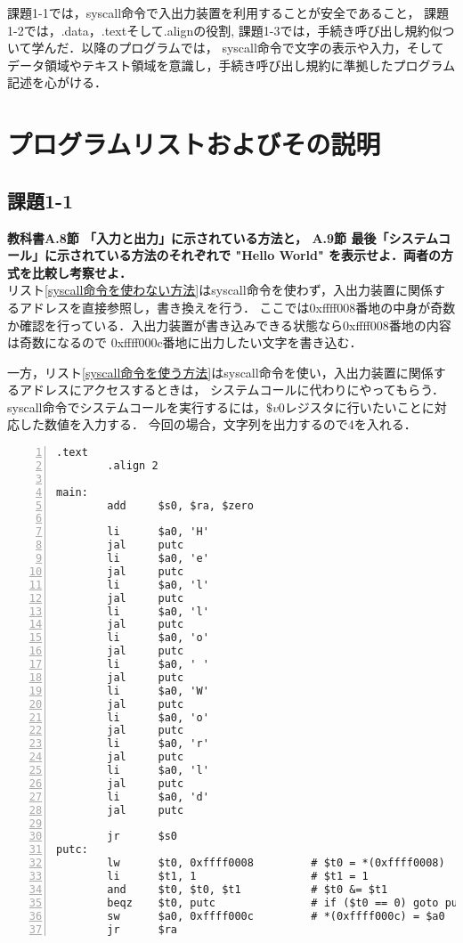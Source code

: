 \documentclass[11pt]{jarticle}
\begin{document}
課題1-1では，syscall命令で入出力装置を利用することが安全であること，
課題1-2では，.data，.textそして.alignの役割,
課題1-3では，手続き呼び出し規約似ついて学んだ．以降のプログラムでは，
syscall命令で文字の表示や入力，そしてデータ領域やテキスト領域を意識し，手続き呼び出し規約に準拠したプログラム記述を心がける．

\section{プログラムリストおよびその説明}

\subsection{課題1-1}

\textbf{教科書A.8節 「入力と出力」に示されている方法と， A.9節 最後「システムコール」に示されている方法のそれぞれで "Hello World" を表示せよ．両者の方式を比較し考察せよ．}\\

リスト\ref{syscall命令を使わない方法}はsyscall命令を使わず，入出力装置に関係するアドレスを直接参照し，書き換えを行う．
ここでは0xffff008番地の中身が奇数か確認を行っている．入出力装置が書き込みできる状態なら0xffff008番地の内容は奇数になるので
0xffff000c番地に出力したい文字を書き込む．

一方，リスト\ref{syscall命令を使う方法}はsyscall命令を使い，入出力装置に関係するアドレスにアクセスするときは，
システムコールに代わりにやってもらう．
syscall命令でシステムコールを実行するには，$\$v0$レジスタに行いたいことに対応した数値を入力する．
今回の場合，文字列を出力するので4を入れる．

\begin{lstlisting}[caption=syscall命令を使わない方法,label=syscall命令を使わない方法,numbers=left]
        .text
        .align 2

main:
        add     $s0, $ra, $zero
		
        li      $a0, 'H'                
        jal     putc
        li      $a0, 'e'                
        jal     putc
        li      $a0, 'l'                
        jal     putc
        li      $a0, 'l'                
        jal     putc
        li      $a0, 'o'                
        jal     putc   
        li      $a0, ' '                
        jal     putc   
        li      $a0, 'W'                
        jal     putc   
        li      $a0, 'o'                
        jal     putc   
        li      $a0, 'r'                
        jal     putc   
        li      $a0, 'l'                
        jal     putc   
        li      $a0, 'd'                
        jal     putc                    
        
        jr      $s0
putc:
        lw      $t0, 0xffff0008         # $t0 = *(0xffff0008)
        li      $t1, 1                  # $t1 = 1
        and     $t0, $t0, $t1           # $t0 &= $t1
        beqz    $t0, putc               # if ($t0 == 0) goto putc
        sw      $a0, 0xffff000c         # *(0xffff000c) = $a0
        jr      $ra
\end{lstlisting}
\end{document}
